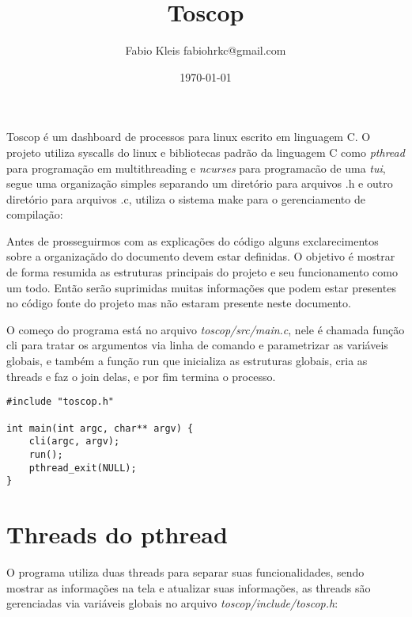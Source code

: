 \documentclass{article}
\title{Toscop}
\author{Fabio Kleis fabiohrkc@gmail.com}
\date{\today}
\begin{document}
\maketitle

Toscop é um dashboard de processos para linux escrito em linguagem C. 
O projeto utiliza syscalls do linux e bibliotecas padrão da linguagem C
como \textit{pthread} para programação em multithreading e \textit{ncurses}
para programacão de uma \textit{tui}, segue uma organização simples 
separando um diretório para arquivos .h e outro diretório para arquivos .c,
utiliza o sistema make para o gerenciamento de compilação:  

\hfill \break
Antes de prosseguirmos com as explicações do código alguns exclarecimentos 
sobre a organizaçãdo do documento devem estar definidas. O objetivo é mostrar
de forma resumida as estruturas principais do projeto e seu funcionamento
como um todo. Então serão suprimidas muitas informações que podem estar
presentes no código fonte do projeto mas não estaram presente neste documento.

O começo do programa está no arquivo \textit{toscop/src/main.c}, nele é chamada
função cli para tratar os argumentos via linha de comando e parametrizar as variáveis
globais, e também a função run que inicializa as estruturas globais, cria as threads e
faz o join delas, e por fim termina o processo.

\begin{verbatim}
#include "toscop.h"

int main(int argc, char** argv) {
    cli(argc, argv);
    run();
    pthread_exit(NULL);
}
\end{verbatim}

\section{Threads do pthread}
O programa utiliza duas threads para separar suas funcionalidades, sendo 
mostrar as informações na tela e atualizar suas informações, as threads
são gerenciadas via variáveis globais no arquivo \textit{toscop/include/toscop.h}:
\end{document}
